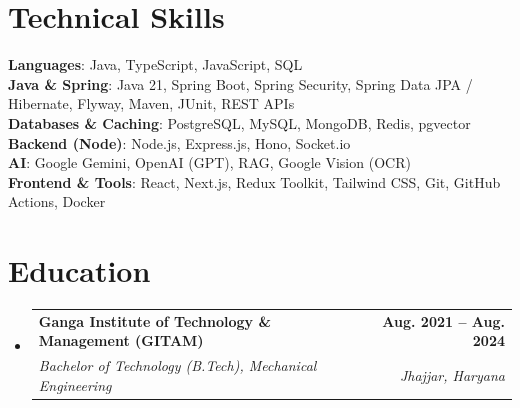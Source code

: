 \documentclass[letterpaper,11pt]{article}
\makeatletter
\newcommand{\resumeSubheading}[4]{
  \vspace{-2pt}\item
    \begin{tabular*}{1.0\textwidth}[t]{l@{\extracolsep{\fill}}r}
      \textbf{#1} & \textbf{\small #2} \\
      \textit{\small#3} & \textit{\small #4} \\
    \end{tabular*}\vspace{-7pt}
}
\newcommand{\resumeSubHeadingListStart}{\begin{itemize}[leftmargin=0.0in, label={}]}
\newcommand{\resumeSubHeadingListEnd}{\end{itemize}}
\makeatother
\begin{document}
\section{Technical Skills}
 \begin{itemize}[leftmargin=0.15in, label={}]
    \small{\item{
     \textbf{Languages}{: Java, TypeScript, JavaScript, SQL} \\
     \textbf{Java \& Spring}{: Java 21, Spring Boot, Spring Security, Spring Data JPA / Hibernate, Flyway, Maven, JUnit, REST APIs} \\
     \textbf{Databases \& Caching}{: PostgreSQL, MySQL, MongoDB, Redis, pgvector} \\
     \textbf{Backend (Node)}{: Node.js, Express.js, Hono, Socket.io} \\
     \textbf{AI}{: Google Gemini, OpenAI (GPT), RAG, Google Vision (OCR)} \\
     \textbf{Frontend \& Tools}{: React, Next.js, Redux Toolkit, Tailwind CSS, Git, GitHub Actions, Docker} \\
    }}
 \end{itemize}
\vspace{-9pt}

\section{Education}
  \resumeSubHeadingListStart
    \resumeSubheading
      {Ganga Institute of Technology \& Management (GITAM)}{Aug. 2021 -- Aug. 2024}
      {Bachelor of Technology (B.Tech), Mechanical Engineering}{Jhajjar, Haryana}
  \resumeSubHeadingListEnd
\end{document}

